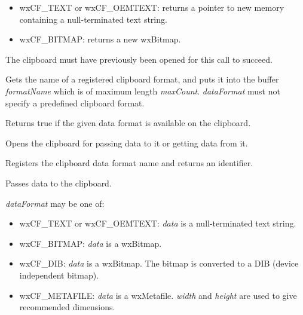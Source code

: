 \begin{itemize}\itemsep=0pt
\item wxCF\_TEXT or wxCF\_OEMTEXT: returns a pointer to new memory containing a null-terminated text string.
\item wxCF\_BITMAP: returns a new wxBitmap.
\end{itemize}

The clipboard must have previously been opened for this call to succeed.


\label{wxgetclipboardformatname}


Gets the name of a registered clipboard format, and puts it into the buffer {\it formatName} which is of maximum
length {\it maxCount}. {\it dataFormat} must not specify a predefined clipboard format.


\label{wxisclipboardformatavailable}


Returns true if the given data format is available on the clipboard.


\label{wxopenclipboard}


Opens the clipboard for passing data to it or getting data from it.


\label{wxregisterclipboardformat}


Registers the clipboard data format name and returns an identifier.


\label{wxsetclipboarddata}


Passes data to the clipboard.

{\it dataFormat} may be one of:

\begin{itemize}\itemsep=0pt
\item wxCF\_TEXT or wxCF\_OEMTEXT: {\it data} is a null-terminated text string.
\item wxCF\_BITMAP: {\it data} is a wxBitmap.
\item wxCF\_DIB: {\it data} is a wxBitmap. The bitmap is converted to a DIB (device independent bitmap).
\item wxCF\_METAFILE: {\it data} is a wxMetafile. {\it width} and {\it height} are used to give recommended dimensions.
\end{itemize}

